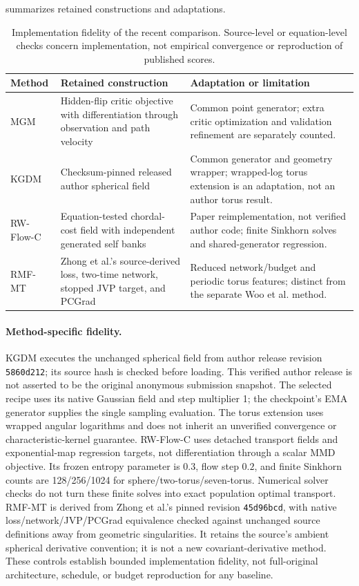  summarizes retained constructions and adaptations.
\begin{table}[t]
\caption{Implementation fidelity of the recent comparison. Source-level or
equation-level checks concern implementation, not empirical convergence or
reproduction of published scores.}
\label{tab:recent-fidelity}
\centering\small
\begin{tabular}{@{}p{.12\linewidth}p{.38\linewidth}p{.44\linewidth}@{}}
\toprule
Method & Retained construction & Adaptation or limitation \\
\midrule
MGM & Hidden-flip critic objective with differentiation through observation
and path velocity & Common point generator; extra critic optimization and
validation refinement are separately counted. \\
KGDM & Checksum-pinned released author spherical field
\citep{estebancasadevall2026kgdm} & Common generator and geometry wrapper;
wrapped-log torus extension is an adaptation, not an author torus result. \\
RW-Flow-C & Equation-tested chordal-cost field with independent generated
self banks \citep{nurgulan2026rwflow} & Paper reimplementation, not verified
author code; finite Sinkhorn solves and shared-generator regression. \\
RMF-MT & Zhong et al.'s source-derived loss, two-time network, stopped JVP
target, and PCGrad \citep{zhong2026rmf} & Reduced network/budget and periodic
torus features; distinct from the separate Woo et al. method. \\
\bottomrule
\end{tabular}
\end{table}

\paragraph{Method-specific fidelity.}
KGDM executes the unchanged spherical field from author release revision
\texttt{5860d212}; its source hash is checked before loading. This verified
author release is not asserted to be the original anonymous submission
snapshot. The selected recipe uses its native Gaussian field and step
multiplier 1; the checkpoint's EMA generator supplies the single sampling
evaluation. The torus extension uses wrapped angular logarithms and does not
inherit an unverified convergence or characteristic-kernel guarantee.
RW-Flow-C uses detached transport fields and exponential-map regression
targets, not differentiation through a scalar MMD objective. Its frozen
entropy parameter is $0.3$, flow step $0.2$, and finite Sinkhorn counts are
128/256/1024 for sphere/two-torus/seven-torus. Numerical solver checks do not
turn these finite solves into exact population optimal transport.
RMF-MT is derived from Zhong et al.'s pinned revision \texttt{45d96bcd}, with
native loss/network/JVP/PCGrad equivalence checked against unchanged source
definitions away from geometric singularities. It retains the source's ambient
spherical derivative convention; it is not a new covariant-derivative method.
These controls establish bounded implementation fidelity, not full-original
architecture, schedule, or budget reproduction for any baseline.

